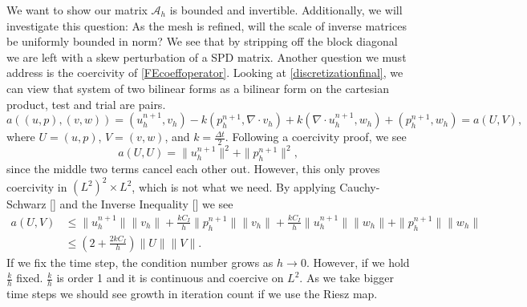\documentclass[11pt]{article}
\begin{document}
We want to show our matrix $\mathscr{A}_h$ is bounded and invertible. Additionally, we will investigate this question: As the mesh is refined, will the scale of inverse matrices be uniformly bounded in norm? We see that by stripping off the block diagonal we are left with a skew perturbation of a SPD matrix.
Another question we must address is the coercivity of \eqref{FEcoeffoperator}. %
Looking at \eqref{discretizationfinal}, we can view that system of two bilinear forms as a bilinear form on the cartesian product, test and trial are pairs. 
\begin{equation}\label{bilinear}
a((u,p),(v,w)) = (u_h^{n+1},v_h) - k(p_h^{n+1}, \nabla \cdot v_h) + k(\nabla \cdot u_h^{n+1},w_h) + (p_h^{n+1},w_h) = a(U,V),
\end{equation}
where $U = (u,p)$, $V = (v,w)$, and $k = \frac{\Delta t}{2}$. Following a coercivity proof, we see
\begin{equation}
a(U,U) = \|u_h^{n+1}\|^2 + \|p_h^{n+1}\|^2,
\end{equation}
since the middle two terms cancel each other out. However, this only proves coercivity in $(L^2)^2 \times L^2$, which is not what we need.
By applying Cauchy-Schwarz [] and the Inverse Inequality [] we see
\begin{equation}
\begin{split}
a(U,V) &\leq \|u_h^{n+1}\|\|v_h\| + \frac{kC_I}{h}\|p_h^{n+1}\|\|v_h\| + \frac{kC_I}{h}\|u_h^{n+1}\|\|w_h\| + \|p_h^{n+1}\|\|w_h\| \\
&\leq \left(2 + \frac{2kC_I}{h}\right)\|U\|\|V\|.
\end{split}
\end{equation}
If we fix the time step, the condition number grows as $h \rightarrow 0$. However, if we hold $\frac{k}{h}$ fixed. $\frac{k}{h}$ is order 1 and it is continuous and coercive on $L^2$. As we take bigger time steps we should see growth in iteration count if we use the Riesz map.
\end{document}
